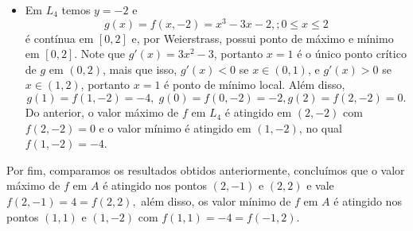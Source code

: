 \begin{example}
\begin{itemize}
            Além disso, \(g(-1) = f(0,-1) = 2\), \(g(1) = f(0,1) = -2\), \(g(-2) = f(0,-2) = -2\) e \(g(2) = f(0,2) = 2\). Portanto, o valor máximo de \(f\) em \(L_3\) é atingido nos pontos \((0,-1)\) e \((0,2)\) com \(f(0,-1) = 2 = f(0,2)\), e o valor mínimo de \(f\) em \(L_3\) é atingido nos pontos \((0,1)\) e \((0,-2)\) com \(f(0,1) = 2 = f(0,-2)\).

            \item Em \(L_4\) temos \(y = -2\) e \[g(x) = f(x,-2) = x^3 - 3x - 2,; 0\leq x\leq 2\] é contínua em \([0,2]\) e, por Weierstrass, possui ponto de máximo e mínimo em \([0,2]\). Note que \(g'(x) = 3x^2 - 3\), portanto \(x=1\) é o único ponto crítico de \(g\) em \((0,2)\), mais que isso, \(g'(x) < 0\) se \(x\in(0,1)\), e \(g'(x) > 0\) se \(x\in(1,2)\), portanto \(x=1\) é ponto de mínimo local. Além disso, \[g(1) = f(1,-2) = -4,\; g(0) = f(0,-2) = -2, g(2) = f(2,-2) = 0.\] Do anterior, o valor máximo de \(f\) em \(L_4\) é atingido em \((2,-2)\) com \(f(2,-2) = 0\) e o valor mínimo é atingido em \((1,-2)\), no qual \(f(1,-2)= -4\).
        \end{itemize}

        Por fim, comparamos os resultados obtidos anteriormente, concluímos que o valor máximo de \(f\) em \(A\) é atingido nos pontos \((2,-1)\) e \((2,2)\) e vale \(f(2,-1) = 4 = f(2,2),\) além disso, os valor mínimo de \(f\) em \(A\) é atingido nos pontos \((1,1)\) e \((1,-2)\) com \(f(1,1) = -4 = f(-1,2)\).
\end{example}

